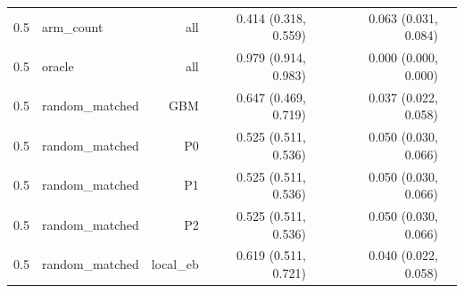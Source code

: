 \begin{tabular}{llrrrrrr}
0.5 & arm\_count & all & 0.414 (0.318, 0.559) &  &  & 0.063 (0.031, 0.084) &  \\
0.5 & oracle & all & 0.979 (0.914, 0.983) &  &  & 0.000 (0.000, 0.000) &  \\
0.5 & random\_matched & GBM & 0.647 (0.469, 0.719) &  &  & 0.037 (0.022, 0.058) &  \\
0.5 & random\_matched & P0 & 0.525 (0.511, 0.536) &  &  & 0.050 (0.030, 0.066) &  \\
0.5 & random\_matched & P1 & 0.525 (0.511, 0.536) &  &  & 0.050 (0.030, 0.066) &  \\
0.5 & random\_matched & P2 & 0.525 (0.511, 0.536) &  &  & 0.050 (0.030, 0.066) &  \\
0.5 & random\_matched & local\_eb & 0.619 (0.511, 0.721) &  &  & 0.040 (0.022, 0.058) &  \\
\bottomrule
\end{tabular}
